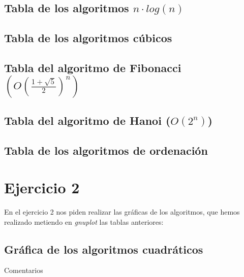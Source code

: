 \documentclass[a4paper, 11pt]{article}
\begin{document}
\subsection{Tabla de los algoritmos $n\cdot log(n)$ }


\subsection{Tabla de los algoritmos cúbicos}



\subsection{Tabla del algoritmo de Fibonacci $(O(\frac{1+\sqrt{5}}{2})^n)$}



\subsection{Tabla del algoritmo de Hanoi ($O(2^n)$)}


\subsection{Tabla de los algoritmos de ordenación}




\newpage
\section{Ejercicio 2}

En el ejercicio 2 nos piden realizar las gráficas de los algoritmos, que hemos
realizado metiendo en \textit{gnuplot} las tablas anteriores:

\subsection{Gráfica de los algoritmos cuadráticos}
Comentarios
\end{document}
